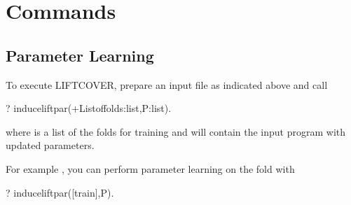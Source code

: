 \documentclass[letterpaper,10pt,english]{sphinxmanual}
\begin{document}
\section{Commands}
\label{\detokenize{index:commands}}

\subsection{Parameter Learning}
\label{\detokenize{index:parameter-learning}}
\sphinxAtStartPar
To execute LIFTCOVER, prepare an input file as indicated above and call

\begin{sphinxVerbatim}[commandchars=\\\{\}]
?\PYGZhy{} induce\PYGZus{}lift\PYGZus{}par(+List\PYGZus{}of\PYGZus{}folds:list,\PYGZhy{}P:list).
\end{sphinxVerbatim}

\sphinxAtStartPar
where  is a list of the folds for training and  will contain
the input program with updated parameters.

\sphinxAtStartPar
For example , you can perform parameter learning on the  fold with

\begin{sphinxVerbatim}[commandchars=\\\{\}]
?\PYGZhy{} induce\PYGZus{}lift\PYGZus{}par([train],P).
\end{sphinxVerbatim}
\end{document}
